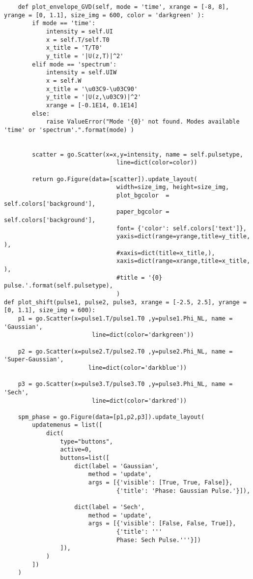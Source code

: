 \begin{verbatim}
    def plot_envelope_GVD(self, mode = 'time', xrange = [-8, 8],  yrange = [0, 1.1], size_img = 600, color = 'darkgreen' ):
        if mode == 'time':
            intensity = self.UI
            x = self.T/self.T0
            x_title = 'T/T0'
            y_title = '|U(z,T)|^2'
        elif mode == 'spectrum':
            intensity = self.UIW
            x = self.W
            x_title = '\u03C9-\u03C90'
            y_title = '|U(z,\u03C9)|^2'
            xrange = [-0.1E14, 0.1E14]
        else:
            raise ValueError("Mode '{0}' not found. Modes available 'time' or 'spectrum'.".format(mode) )
        

        scatter = go.Scatter(x=x,y=intensity, name = self.pulsetype,
                                line=dict(color=color))
        
        return go.Figure(data=[scatter]).update_layout(
                                width=size_img, height=size_img,
                                plot_bgcolor  = self.colors['background'],
                                paper_bgcolor = self.colors['background'],
                                font= {'color': self.colors['text']},
                                yaxis=dict(range=yrange,title=y_title, ), 
                                #xaxis=dict(title=x_title,), 
                                xaxis=dict(range=xrange,title=x_title, ), 
                                #title = '{0} pulse.'.format(self.pulsetype),
                                )
def plot_shift(pulse1, pulse2, pulse3, xrange = [-2.5, 2.5], yrange = [0, 1.1], size_img = 600):
    p1 = go.Scatter(x=pulse1.T/pulse1.T0 ,y=pulse1.Phi_NL, name = 'Gaussian',
                         line=dict(color='darkgreen'))

    p2 = go.Scatter(x=pulse2.T/pulse2.T0 ,y=pulse2.Phi_NL, name = 'Super-Gaussian',
                        line=dict(color='darkblue'))

    p3 = go.Scatter(x=pulse3.T/pulse3.T0 ,y=pulse3.Phi_NL, name = 'Sech',
                         line=dict(color='darkred'))

    spm_phase = go.Figure(data=[p1,p2,p3]).update_layout( 
        updatemenus = list([
            dict(
                type="buttons",
                active=0,
                buttons=list([   
                    dict(label = 'Gaussian',
                        method = 'update',
                        args = [{'visible': [True, True, False]},
                                {'title': 'Phase: Gaussian Pulse.'}]), 

                    dict(label = 'Sech',
                        method = 'update',
                        args = [{'visible': [False, False, True]},
                                {'title': '''
                                Phase: Sech Pulse.'''}])  
                ]),
            )
        ])
    )



\end{verbatim}
